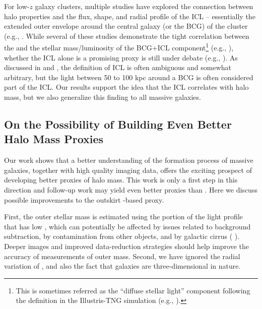 \documentclass[fleqn,usenatbib,useAMS]{mnras}
\begin{document}
    For low-$z$ galaxy clusters, multiple studies have explored the connection between halo
    properties and the flux, shape, and radial profile of the ICL --
    essentially the extended outer envelope around the central galaxy (or the BCG) of the cluster
    (e.g., \citealt{Montes2018, Montes2019, Zhang2019b, Furnell2021, Kluge2021, SampaioSantos2021}.
    While several of these studies demonstrate the tight correlation between the \mvir{} and the
    stellar mass/luminosity of the BCG$+$ICL component\footnote{This is sometimes referred as the
    ``diffuse stellar light'' component following the definition in the Illustris-TNG simulation
    (e.g., \citealt{Zhang2019b, SampaioSantos2021}).} (e.g., \citet{Zhang2019b, Kluge2021,
    SampaioSantos2021}), whether the ICL alone is a promising \mvir{} proxy is still under debate
    (e.g., \citealt{Furnell2021}).
    As discussed in \citet{Huang2018b} and \citet{Kluge2020}, the definition of ICL is often 
    ambiguous and somewhat arbitrary, but the light between 50 to 100 kpc around a BCG is often
    considered part of the ICL. 
    Our results support the idea that the ICL correlates with halo mass, but we also generalize this
    finding to all massive galaxies.

    \subsection{On the Possibility of Building Even Better Halo Mass Proxies}
    \label{sec:better_halo_proxy}
    
    Our work shows that a better understanding of the formation process of massive galaxies,
    together with high quality imaging data, offers the exciting prospect of developing better
    proxies of halo mass. 
    This work is only a first step in this direction and follow-up work may yield even better
    proxies than . 
    Here we discuss possible improvements to the outskirt \mstar{}-based \mvir{} proxy.
    
    First, the outer stellar mass is estimated using the portion of the light profile that has low
    \snratio{}, which can potentially be affected by issues related to background subtraction, by
    contamination from other objects, and by galactic cirrus (\eg{} \citealt{Roman2020}). 
    Deeper images and improved data-reduction strategies should help improve the accuracy of
    measurements of outer mass.  
    Second, we have ignored the radial variation of \mlratio{}, and also the fact that galaxies are
    three-dimensional in nature. 
    
\end{document}
